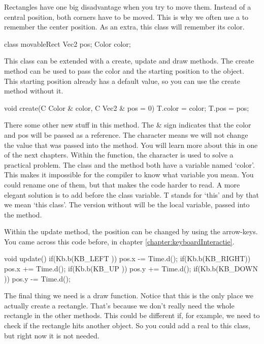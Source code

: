 Rectangles have one big disadvantage when you try to move them. Instead of a central position, both corners have to be moved. This is why we often use a  to remember the center position. As an extra, this class will remember its color.


\begin{code}
class movableRect {
  	Vec2 pos;
	Color color;
}
\end{code}

This class can be extended with a create, update and draw methods. The create method can be used to pass the color and the starting position to the object. This starting position already has a default value, so you can use the create method without it.

\begin{code}
void create(C Color & color, C Vec2 & pos = 0) {
  	T.color = color;
	T.pos = pos;
}
\end{code}

\begin{note}
There some other new stuff in this method. The \& sign indicates that the color and pos will be passed as a reference. The character  means we will not change the value that was passed into the method. You will learn more about this in one of the next chapters. Within the function, the character  is used to solve a practical problem. The class and the method both have a variable named `color'. This makes it impossible for the compiler to know what variable you mean. You could rename one of them, but that makes the code harder to read. A more elegant solution is to add  before the class variable. T stands for `this' and by that we mean `this class'. The version without  will be the local variable, passed into the method.
\end{note}

Within the update method, the position can be changed by using the arrow-keys. You came across this code before, in chapter \ref{chapter:keyboardInteractie}.

\begin{code}
void update() {
	if(Kb.b(KB_LEFT )) pos.x -= Time.d();
	if(Kb.b(KB_RIGHT)) pos.x += Time.d();
	if(Kb.b(KB_UP   )) pos.y += Time.d();
	if(Kb.b(KB_DOWN )) pos.y -= Time.d();
}
\end{code}

The final thing we need is a draw function. Notice that this is the only place we actually create a rectangle. That's because we don't really need the whole rectangle in the other methods. This could be different if, for example, we need to check if the rectangle hits another object. So you could add a real  to this class, but right now it is not needed.

